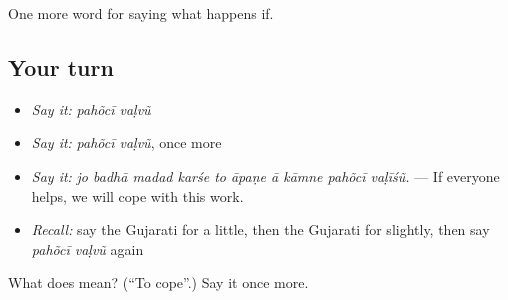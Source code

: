 \begin{grammarlens}[title={What you've built}]
One more word for saying what happens if.
\end{grammarlens}

\subsection*{Your turn}
\begin{itemize}
\raggedright
  \item \emph{Say it:} \emph{pahõcī vaḷvũ}
  \item \emph{Say it:} \emph{pahõcī vaḷvũ}, once more
  \item \emph{Say it:} \emph{jo badhā madad karśe to āpaṇe ā kāmne pahõcī vaḷīśũ.} — If everyone helps, we will cope with this work.
  \item \emph{Recall:} say the Gujarati for a little, then the Gujarati for slightly, then say \emph{pahõcī vaḷvũ} again
\end{itemize}

\begin{tcolorbox}[breakable,colback=teal!4,colframe=teal!35!black,title={Before you move on}]
What does   mean? (\textquotedblleft{}To cope\textquotedblright{}.) Say it once more.
\end{tcolorbox}
